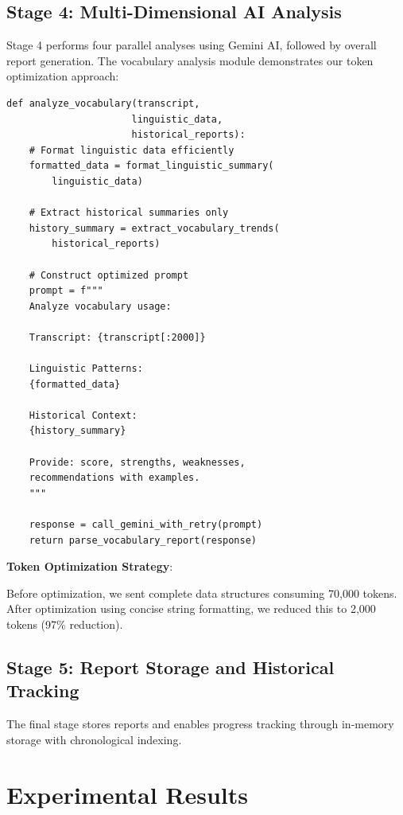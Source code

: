 \documentclass[conference]{IEEEtran}
\begin{document}
\subsection{Stage 4: Multi-Dimensional AI Analysis}

Stage 4 performs four parallel analyses using Gemini AI, followed by overall report generation. The vocabulary analysis module demonstrates our token optimization approach:

\begin{lstlisting}[caption={Token-Optimized Analysis}]
def analyze_vocabulary(transcript, 
                      linguistic_data, 
                      historical_reports):
    # Format linguistic data efficiently
    formatted_data = format_linguistic_summary(
        linguistic_data)
    
    # Extract historical summaries only
    history_summary = extract_vocabulary_trends(
        historical_reports)
    
    # Construct optimized prompt
    prompt = f"""
    Analyze vocabulary usage:
    
    Transcript: {transcript[:2000]}
    
    Linguistic Patterns:
    {formatted_data}
    
    Historical Context:
    {history_summary}
    
    Provide: score, strengths, weaknesses,
    recommendations with examples.
    """
    
    response = call_gemini_with_retry(prompt)
    return parse_vocabulary_report(response)
\end{lstlisting}

\textbf{Token Optimization Strategy}:

Before optimization, we sent complete data structures consuming 70,000 tokens. After optimization using concise string formatting, we reduced this to 2,000 tokens (97\% reduction).

\subsection{Stage 5: Report Storage and Historical Tracking}

The final stage stores reports and enables progress tracking through in-memory storage with chronological indexing.



\section{Experimental Results}
\end{document}
